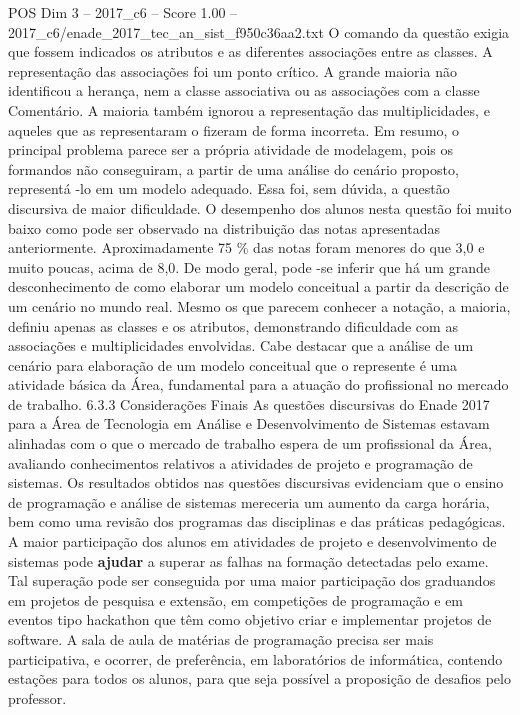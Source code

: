 \begin{textsample}{POS Dim 3 – 2017\_c6 – Score 1.00 – 2017\_c6/enade\_2017\_tec\_an\_sist\_f950c36aa2.txt}
O comando da questão exigia que fossem indicados os atributos e as diferentes associações entre as classes.
A representação das associações foi um ponto crítico.
A grande maioria não identificou a herança, nem a classe associativa ou as associações com a classe Comentário.
A maioria também ignorou a representação das multiplicidades, e aqueles que as representaram o fizeram de forma incorreta.
Em resumo, o principal problema parece ser a própria atividade de modelagem, pois os formandos não conseguiram, a partir de uma análise do cenário proposto, representá -lo em um modelo adequado.
Essa foi, sem dúvida, a questão discursiva de maior dificuldade.
O desempenho dos alunos nesta questão foi muito baixo como pode ser observado na distribuição das notas apresentadas anteriormente.
Aproximadamente 75 \% das notas foram menores do que 3,0 e muito poucas, acima de 8,0.
De modo geral, pode -se inferir que há um grande desconhecimento de como elaborar um modelo conceitual a partir da descrição de um cenário no mundo real.
Mesmo os que parecem conhecer a notação, a maioria, definiu apenas as classes e os atributos, demonstrando dificuldade com as associações e multiplicidades envolvidas.
Cabe destacar que a análise de um cenário para elaboração de um modelo conceitual que o represente é uma atividade básica da Área, fundamental para a atuação do profissional no mercado de trabalho. 6.3.3 Considerações Finais As questões discursivas do Enade 2017 para a Área de Tecnologia em Análise e Desenvolvimento de Sistemas estavam alinhadas com o que o mercado de trabalho espera de um profissional da Área, avaliando conhecimentos relativos a atividades de projeto e programação de sistemas.
Os resultados obtidos nas questões discursivas evidenciam que o ensino de programação e análise de sistemas mereceria um aumento da carga horária, bem como uma revisão dos programas das disciplinas e das práticas pedagógicas.
A maior participação dos alunos em atividades de projeto e desenvolvimento de sistemas pode \textbf{ajudar} a superar as falhas na formação detectadas pelo exame.
Tal superação pode ser conseguida por uma maior participação dos graduandos em projetos de pesquisa e extensão, em competições de programação e em eventos tipo hackathon que têm como objetivo criar e implementar projetos de software.
A sala de aula de matérias de programação precisa ser mais participativa, e ocorrer, de preferência, em laboratórios de informática, contendo estações para todos os alunos, para que seja possível a proposição de desafios pelo professor.

\end{textsample}
